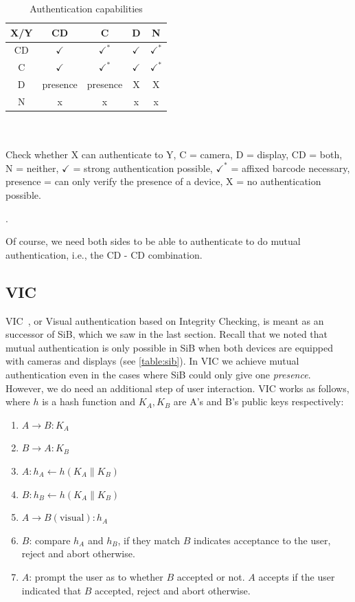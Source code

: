 \documentclass[conference, 11pt]{sty/IEEEtran}
\newlength{\arrow}
\begin{document}
\begin{table}[h]
    \begin{tabular}{ c | c c c c }
      X/Y  & CD & C & D & N \\ \hline
        CD & $\checkmark$ & $\checkmark^*$ & $\checkmark$ & $\checkmark^*$ \\
        C & $\checkmark$ & $\checkmark^*$ & $\checkmark$ & $\checkmark^*$ \\
        D & presence & presence & X & X \\
        N & x & x & x & x \\
    \end{tabular}
    \\ \\
    \small{Check whether X can authenticate to Y, C = camera, D = display, CD = both, N = neither, $\checkmark$ = strong authentication possible, $\checkmark^*$ = affixed barcode necessary, presence = can only verify the presence of a device, X = no authentication possible.}
    \caption{Authentication capabilities}.
    \label{table:sib}
\end{table}

Of course, we need both sides to be able to authenticate to do mutual authentication, i.e., the CD - CD combination.

\subsection{VIC}
\label{ssec:vic}

VIC~\cite{saxena2006secure}, or Visual authentication based on Integrity Checking, is meant as an successor of SiB, which we saw in the last section.
Recall that we noted that mutual authentication is only possible in SiB when both devices are equipped with cameras and displays (see \autoref{table:sib}).
In VIC we achieve mutual authentication even in the cases where SiB could only give one \emph{presence}.
However, we do need an additional step of user interaction.
VIC works as follows, where $h$ is a hash function and $K_A, K_B$ are A's and B's public keys respectively:

\begin{enumerate}
    \item $A \rightarrow B: K_A$
    \item $B \rightarrow A: K_B$
    \item $A: h_A \gets h(K_A \| K_B)$
    \item $B: h_B \gets h(K_A \| K_B)$
    \item $A \rightarrow B(\text{visual}): h_A$
    \item $B$: compare $h_A$ and $h_B$, if they match $B$ indicates acceptance to the user, reject and abort otherwise.
    \item $A$: prompt the user as to whether $B$ accepted or not. $A$ accepts if the user indicated that $B$ accepted, reject and abort otherwise.
\end{enumerate}
\end{document}
